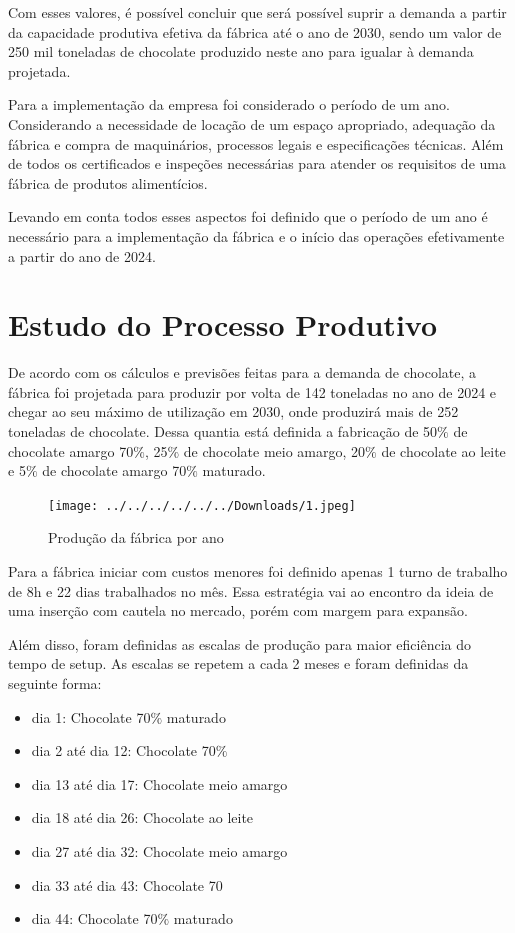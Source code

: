 \documentclass[
	12pt,				%
	openright,			%
	oneside,			%
	a4paper,			%
	english,			%
	french,				%
	spanish,			%
	brazil				%
	]{abntex2}
\begin{document}
Com esses valores, é possível concluir que será possível suprir a demanda a partir da capacidade produtiva efetiva da fábrica até o ano de 2030, sendo um valor de 250 mil toneladas de chocolate produzido neste ano para igualar à demanda projetada.


Para a implementação da empresa foi considerado o período de um ano. Considerando a necessidade de locação de um espaço apropriado, adequação da fábrica e compra de maquinários, processos legais e especificações técnicas. Além de todos os certificados e inspeções necessárias para atender os requisitos de uma fábrica de produtos alimentícios.

Levando em conta todos esses aspectos foi definido que o período de um ano é necessário para a implementação da fábrica e o início das operações efetivamente a partir do ano de 2024.


\chapter{Estudo do Processo Produtivo}

De acordo com os cálculos e previsões feitas para a demanda de chocolate, a fábrica foi projetada para produzir por volta de 142 toneladas no ano de 2024 e chegar ao seu máximo de utilização em 2030, onde produzirá mais de 252 toneladas de chocolate. Dessa quantia está definida a fabricação de 50$\%$ de chocolate amargo 70$\%$, 25$\%$ de chocolate meio amargo, 20$\%$ de chocolate ao leite e 5$\%$ de chocolate amargo 70$\%$ maturado.

\begin{figure}[H]
\begin{center}
\caption{Produção da fábrica por ano}
\texttt{[image: ../../../../../../Downloads/1.jpeg]} 
\end{center}
\end{figure}

Para a fábrica iniciar com custos menores foi definido apenas 1 turno de trabalho de 8h e 22 dias trabalhados no mês. Essa estratégia vai ao encontro da ideia de uma inserção com cautela no mercado, porém com margem para expansão.

Além disso, foram definidas as escalas de produção para maior eficiência do tempo de setup. As escalas se repetem a cada 2 meses e foram definidas da seguinte forma:

\begin{itemize}
\item dia 1: Chocolate 70$\%$ maturado
\item dia 2 até dia 12: Chocolate 70$\%$
\item dia 13 até dia 17: Chocolate meio amargo
\item dia 18 até dia 26: Chocolate ao leite
\item dia 27 até dia 32: Chocolate meio amargo
\item dia 33 até dia 43: Chocolate 70%
\item dia 44: Chocolate 70$\%$ maturado
\end{itemize}
\end{document}

